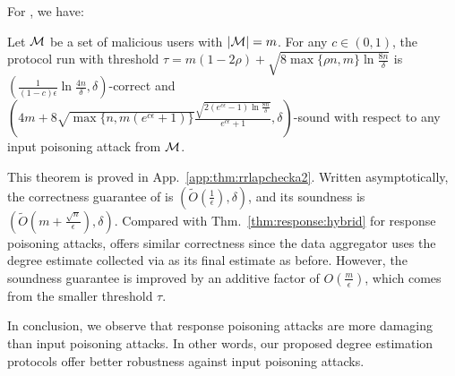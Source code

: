 For \DegHybrid{}, we have: \vspace{-0.2cm}
\begin{thm}\label{thm:rrlapchecka2}
	Let $\mathcal{M}$ be a set of malicious users with $|\mathcal{M}| = m$. 
  For any $c \in (0,1)$, the \DegHybrid{} protocol run with threshold $\tau = m(1-2\rho) + \sqrt{8 \max\{\rho n, m\} \ln \frac{8n}{\delta}}$ is $(\frac{1}{(1-c)\epsilon}\ln \tfrac{4n}{\delta} ,\delta)$-correct and $(4m+8\sqrt{\max\{n, m(e^{c\epsilon}+1)\}}\frac{\sqrt{2(e^{c\epsilon}-1) \ln \frac{8n}{\delta}}}{e^{c\epsilon}+1}, \delta)$-sound with respect to any input poisoning attack from $\mathcal{M}$. \label{thm:input:hybrid}
\end{thm}
This theorem is proved in App.~\ref{app:thm:rrlapchecka2}.
Written asymptotically, the correctness guarantee of \DegHybrid{} is $(\tilde{O}(\frac{1}{\epsilon}), \delta)$, and its soundness is $(\tilde{O}(m + \frac{\sqrt{n}}{\epsilon}), \delta)$.
Compared with Thm.~\ref{thm:response:hybrid} for response poisoning attacks, \DegHybrid{} offers similar correctness since the data aggregator uses the degree estimate collected via \RLap{} as its final estimate as before. However, the soundness guarantee  is improved by an additive factor of $O(\frac{m}{\epsilon})$, which comes from the smaller threshold $\tau$. %

In conclusion, we observe that response poisoning attacks are more damaging than input poisoning attacks. In other words, our proposed degree estimation protocols offer better robustness against input poisoning attacks.


